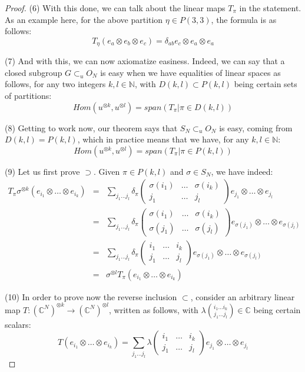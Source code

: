\documentclass[12pt]{amsbook}
\begin{document}
\begin{proof}
(6) With this done, we can talk about the linear maps $T_\pi$ in the statement. As an example here, for the above partition $\eta\in P(3,3)$, the formula is as follows:
$$T_\eta(e_a\otimes e_b\otimes e_c)=\delta_{ab}e_c\otimes e_a\otimes e_a$$

(7) And with this, we can now axiomatize easiness. Indeed, we can say that a closed subgroup $G\subset_uO_N$ is easy when we have equalities of linear spaces as follows, for any two integers $k,l\in\mathbb N$, with $D(k,l)\subset P(k,l)$ being certain sets of partitions:
$$Hom(u^{\otimes k},u^{\otimes l})=span\left(T_\pi\Big|\pi\in D(k,l)\right)$$

(8) Getting to work now, our theorem says that $S_N\subset_uO_N$ is easy, coming from $D(k,l)=P(k,l)$, which in practice means that we have, for any $k,l\in\mathbb N$:
$$Hom(u^{\otimes k},u^{\otimes l})=span\left(T_\pi\Big|\pi\in P(k,l)\right)$$

(9) Let us first prove $\supset$. Given $\pi\in P(k,l)$ and $\sigma\in S_N$, we have indeed:
\begin{eqnarray*}
T_\pi\sigma^{\otimes k}(e_{i_1}\otimes\ldots\otimes e_{i_k})
&=&\sum_{j_1\ldots j_l}\delta_\pi
\begin{pmatrix}\sigma(i_1)&\ldots&\sigma(i_k)\\ j_1&\ldots& j_l\end{pmatrix}e_{j_1}\otimes\ldots\otimes e_{j_l}\\
&=&\sum_{j_1\ldots j_l}\delta_\pi
\begin{pmatrix}\sigma(i_1)&\ldots&\sigma(i_k)\\ \sigma(j_1)&\ldots&\sigma(j_l)\end{pmatrix}e_{\sigma(j_1)}\otimes\ldots\otimes e_{\sigma(j_l)}\\
&=&\sum_{j_1\ldots j_l}\delta_\pi
\begin{pmatrix}i_1&\ldots& i_k\\ j_1&\ldots& j_l\end{pmatrix}
e_{\sigma(j_1)}\otimes\ldots\otimes e_{\sigma(j_l)}\\
&=&\sigma^{\otimes l}T_\pi(e_{i_1}\otimes\ldots\otimes e_{i_k})
\end{eqnarray*}

(10) In order to prove now the reverse inclusion $\subset$, consider an arbitrary linear map $T:(\mathbb C^N)^{\otimes k}\to(\mathbb C^N)^{\otimes l}$, written as follows, with $\lambda\binom{i_1\ldots i_k}{j_1\ldots j_l}\in\mathbb C$ being certain scalars:
$$T(e_{i_1}\otimes\ldots\otimes e_{i_k})=\sum_{j_1\ldots j_l}\lambda
\begin{pmatrix}i_1&\ldots& i_k\\ j_1&\ldots& j_l\end{pmatrix}e_{j_1}\otimes\ldots\otimes e_{j_l}$$


\end{proof}
\end{document}
